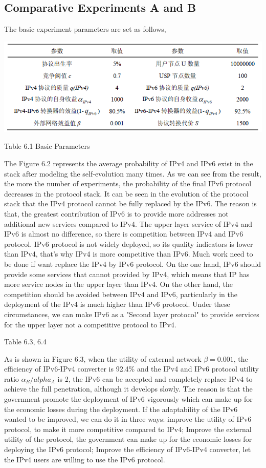 \documentclass{article}
\begin{document}
\subsection{Comparative Experiments A and B}
The basic experiment parameters are set as follows,
\par
\centerline{\includegraphics[width=.7\textwidth]{Table5.png}}
\centerline{Table 6.1 Basic Parameters}
The Figure 6.2 represents the average probability of IPv4 and IPv6 exist in the stack after modeling the self-evolution
many times. As we can see from the result, the more the number of experiments, the probability of the final IPv6 protocol
decreases in the protocol stack. It can be seen in the evolution of the protocol stack that the IPv4 protocol cannot be
fully replaced by the IPv6. The reason is that, the greatest contribution of IPv6 is to provide more addresses not
additional new services compared to IPv4. The upper layer service of IPv4 and IPv6 is almost no difference,  so there
is competition between IPv4 and IPv6 protocol. IPv6 protocol is not widely deployed, so its quality indicators is lower
than IPv4, that's why IPv4 is more competitive than IPv6. Much work need to be done if want replace the IPv4 by IPv6
protocol. On the one hand, IPv6 should provide some services that cannot provided by IPv4, which means that IP has more
service nodes in the upper layer than IPv4. On the other hand, the competition should be avoided between IPv4 and IPv6,
particularly in the deployment of the IPv4 is much higher than IPv6 protocol. Under these circumstances, we can make
IPv6 as a "Second layer protocol" to provide services for the upper layer not a competitive protocol to IPv4.

Table 6.3, 6.4

As is shown in Figure 6.3, when the utility of external network $\beta=0.001$, the efficiency of IPv6-IPv4 converter is 
92.4\% and the IPv4 and IPv6 protocol utility ratio $\alpha_B/alpha_A$ is 2, the IPv6 can be accepted and completely 
replace IPv4 to achieve the full penetration, although it develops slowly.   The reason is that the government promote 
the deployment of IPv6 vigorously which can make up for the economic losses during the deployment. If the adaptability 
of the IPv6 wanted to be improved, we can do it in three ways: improve the utility of IPv6 protocol, to make it more 
competitive compared to IPv4; Improve the external utility of the protocol, the government can make up for the economic 
losses for deploying the IPv6 protocol; Improve the efficiency of IPv6-IPv4 converter, let the IPv4 users are willing 
to use the IPv6 protocol.
\end{document}
